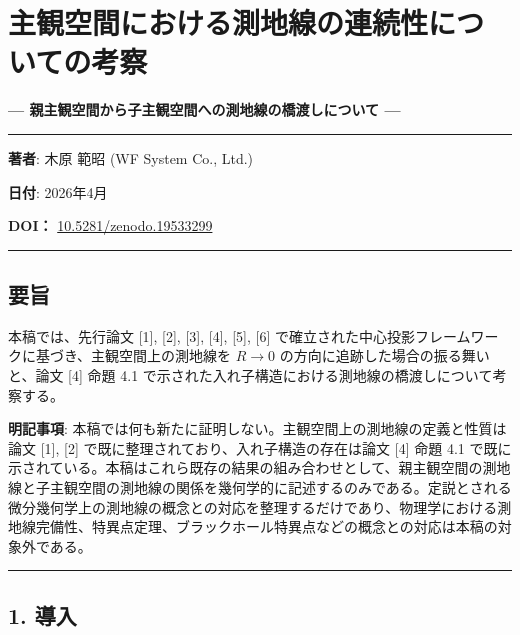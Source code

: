 \documentclass[a4paper,11pt]{ltjsarticle}
\theoremstyle{definition}
\begin{document}
\section{主観空間における測地線の連続性についての考察}\label{ux4e3bux89b3ux7a7aux9593ux306bux304aux3051ux308bux6e2cux5730ux7ddaux306eux9023ux7d9aux6027ux306bux3064ux3044ux3066ux306eux8003ux5bdf}

\textbf{--- 親主観空間から子主観空間への測地線の橋渡しについて ---}

\begin{center}\rule{0.5\linewidth}{0.5pt}\end{center}

\textbf{著者}: 木原 範昭 (WF System Co., Ltd.)

\textbf{日付}: 2026年4月

\textbf{DOI：} \href{https://doi.org/10.5281/zenodo.19533299}{10.5281/zenodo.19533299}

\begin{center}\rule{0.5\linewidth}{0.5pt}\end{center}

\subsection{要旨}\label{ux8981ux65e8}

本稿では、先行論文 {[}1{]}, {[}2{]}, {[}3{]}, {[}4{]}, {[}5{]}, {[}6{]} で確立された中心投影フレームワークに基づき、主観空間上の測地線を \(R \to 0\) の方向に追跡した場合の振る舞いと、論文 {[}4{]} 命題 4.1 で示された入れ子構造における測地線の橋渡しについて考察する。

\textbf{明記事項}: 本稿では何も新たに証明しない。主観空間上の測地線の定義と性質は論文 {[}1{]}, {[}2{]} で既に整理されており、入れ子構造の存在は論文 {[}4{]} 命題 4.1 で既に示されている。本稿はこれら既存の結果の組み合わせとして、親主観空間の測地線と子主観空間の測地線の関係を幾何学的に記述するのみである。定説とされる微分幾何学上の測地線の概念との対応を整理するだけであり、物理学における測地線完備性、特異点定理、ブラックホール特異点などの概念との対応は本稿の対象外である。

\begin{center}\rule{0.5\linewidth}{0.5pt}\end{center}

\subsection{1. 導入}\label{ux5c0eux5165}
\end{document}
